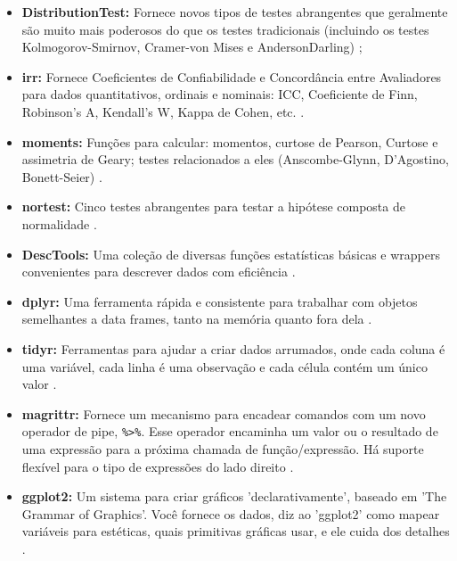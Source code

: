 \documentclass[a4paper,11pt]{article} %
\begin{document}
\begin{itemize}
    \item \textbf{DistributionTest:} Fornece novos tipos de testes abrangentes que geralmente são muito mais poderosos do que os testes tradicionais (incluindo os testes Kolmogorov-Smirnov, Cramer-von Mises e AndersonDarling) \cite{DistributionTest};

    \item \textbf{irr:} Fornece Coeficientes de Confiabilidade e Concordância entre Avaliadores para dados quantitativos, ordinais e nominais: ICC, Coeficiente de Finn, Robinson's A, Kendall's W, Kappa de Cohen, etc. \cite{irr}.

    \item \textbf{moments:} Funções para calcular: momentos, curtose de Pearson, Curtose e assimetria de Geary; testes relacionados a eles (Anscombe-Glynn, D'Agostino, Bonett-Seier) \cite{moments}.

    \item  \textbf{nortest:} Cinco testes abrangentes para testar a hipótese composta de normalidade \cite{nortest}.

    \item \textbf{DescTools:} Uma coleção de diversas funções estatísticas básicas e wrappers convenientes para descrever dados com eficiência \cite{DescTools}.

    \item \textbf{dplyr:} Uma ferramenta rápida e consistente para trabalhar com objetos semelhantes a data frames, tanto na memória quanto fora dela \cite{dplyr}.

    \item \textbf{tidyr:} Ferramentas para ajudar a criar dados arrumados, onde cada coluna é uma variável, cada linha é uma observação e cada célula contém um único valor \cite{tidyr}.

    \item \textbf{magrittr:} Fornece um mecanismo para encadear comandos com um novo operador de pipe, \texttt{\%>\%}. Esse operador encaminha um valor ou o resultado de uma expressão para a próxima chamada de função/expressão. Há suporte flexível para o tipo de expressões do lado direito \cite{magrittr}.

    \item \textbf{ggplot2:} Um sistema para criar gráficos 'declarativamente', baseado em 'The Grammar of Graphics'. Você fornece os dados, diz ao 'ggplot2' como mapear variáveis para estéticas, quais primitivas gráficas usar, e ele cuida dos detalhes \cite{ggplot2}.
\end{itemize}
\end{document}
